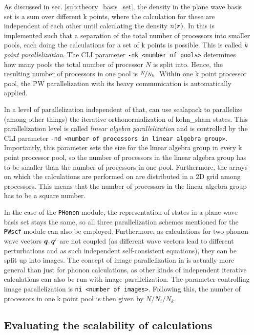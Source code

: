 \documentclass[main.tex]{subfiles}
\begin{document}
As discussed in sec. \ref{sub:theory_basis_set}, the density in the plane wave basis set is a sum over different k points, where the calculation for these are independent of each other until calculating the density \(n( \vb*{r})\).
In \QE this is implemented such that a separation of the total number of processors into smaller pools, each doing the calculations for a set of k points is possible.
This is called \emph{k point parallelization}.
The CLI parameter \texttt{-nk <number of pools>} determines how many pools the total number of processor \(N\) is split into.
Hence, the resulting number of processors in one pool is \(\nicefrac{N}{N_k}\).
Within one k point processor pool, the PW parallelization with its heavy communication is automatically applied.

In a level of parallelization independent of that, \QE can use \gls{scalapack} to parallelize (among other things) the iterative orthonormalization of \acrshort{kohn_sham} states.
This parallelization level is called \emph{linear algebra parallelization} and is controlled by the CLI parameter \texttt{-nd <number of processors in linear algebra group>}.
Importantly, this parameter sets the size for the linear algebra group in every k point processor pool, so the number of processors in the linear algebra group has to be smaller than the number of processors in one pool.
Furthermore, the arrays on which the calculations are performed on are distributed in a 2D grid among processors.
This means that the number of processors in the linear algebra group has to be a square number.

In the case of the \texttt{PHonon} module, the representation of states in a plane-wave basis set stays the same, so all three parallelization schemes mentioned for the \texttt{PWscf} module can also be employed.
Furthermore, as calculations for two phonon wave vectors \(\vb*{q}, \vb*{q}^{\prime}\) are not coupled (as different wave vectors lead to different perturbations and as such independent self-consistent equations), they can be split up into images.
The concept of image parallelization in \QE is actually more general than just for phonon calculations, as other kinds of independent iterative calculations can also be run with image parallelization.
The parameter controlling image parallelization is \texttt{ni <number of images>}.
Following this, the number of processors in one k point pool is then given by \(N / N_i / N_k\).

\subsection{Evaluating the scalability of \QE calculations}\label{sub:scalability_qe}
\end{document}
